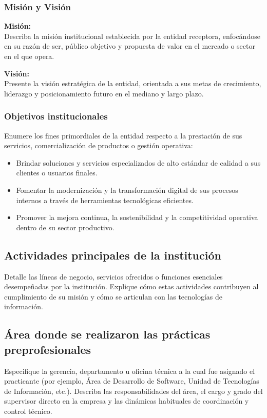 \subsubsection{Misión y Visión}
\textbf{Misión:} \\
Describa la misión institucional establecida por la entidad receptora, enfocándose en su razón de ser, público objetivo y propuesta de valor en el mercado o sector en el que opera.

\vspace{0.3cm}
\textbf{Visión:} \\
Presente la visión estratégica de la entidad, orientada a sus metas de crecimiento, liderazgo y posicionamiento futuro en el mediano y largo plazo.

\subsubsection{Objetivos institucionales}
Enumere los fines primordiales de la entidad respecto a la prestación de sus servicios, comercialización de productos o gestión operativa:
\begin{itemize}
  \item Brindar soluciones y servicios especializados de alto estándar de calidad a sus clientes o usuarios finales.
  \item Fomentar la modernización y la transformación digital de sus procesos internos a través de herramientas tecnológicas eficientes.
  \item Promover la mejora continua, la sostenibilidad y la competitividad operativa dentro de su sector productivo.
\end{itemize}

\subsection{Actividades principales de la institución}
Detalle las líneas de negocio, servicios ofrecidos o funciones esenciales desempeñadas por la institución. Explique cómo estas actividades contribuyen al cumplimiento de su misión y cómo se articulan con las tecnologías de información.

\subsection{Área donde se realizaron las prácticas preprofesionales}
Especifique la gerencia, departamento u oficina técnica a la cual fue asignado el practicante (por ejemplo, Área de Desarrollo de Software, Unidad de Tecnologías de Información, etc.). Describa las responsabilidades del área, el cargo y grado del supervisor directo en la empresa y las dinámicas habituales de coordinación y control técnico.
